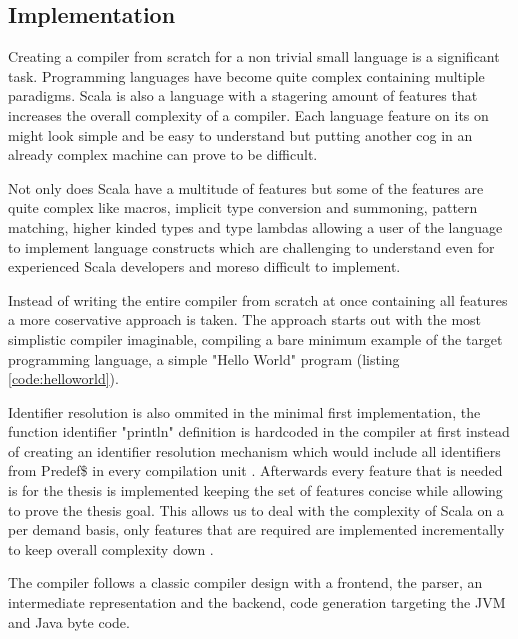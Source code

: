 \documentclass{VUMIFPSbakalaurinis}
\begin{document}
\subsection{Implementation}
Creating a compiler from scratch for a non trivial small language is a significant task.
Programming languages have become quite complex containing multiple paradigms.
Scala is also a language with a stagering amount of features that increases the overall complexity of a compiler.
Each language feature on its on might look simple and be easy to understand but putting another cog in an already complex machine can prove to be difficult.

Not only does Scala have a multitude of features but some of the features are quite complex like macros, implicit type conversion and summoning, pattern matching, higher kinded types and type lambdas allowing a user of the language to implement language constructs \cite{Scala2Union, ShapelessGithub} which are challenging to understand even for experienced Scala developers and moreso difficult to implement.

Instead of writing the entire compiler from scratch at once containing all features a more coservative approach is taken.
The approach starts out with the most simplistic compiler imaginable, compiling a bare minimum example of the target programming language, a simple "Hello World" program (listing \ref{code:helloworld}).



Identifier resolution is also ommited in the minimal first implementation, the function identifier "println" definition is hardcoded in the compiler at first instead of creating an identifier resolution mechanism which would include all identifiers from Predef\$ in every compilation unit \cite{Predef}.
Afterwards every feature that is needed is for the thesis is implemented keeping the set of features concise while allowing to prove the thesis goal.
This allows us to deal with the complexity of Scala on a per demand basis, only features that are required are implemented incrementally to keep overall complexity down \cite{IncrementalCompiler}.

The compiler follows a classic compiler design with a frontend, the parser, an intermediate representation and the backend, code generation targeting the JVM and Java byte code.
\end{document}
